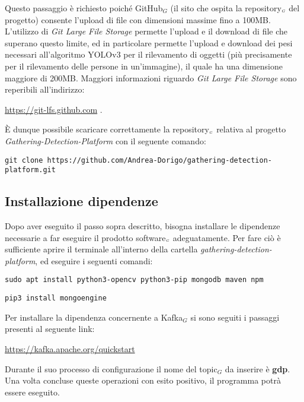 Questo passaggio è richiesto poiché GitHub$_G$ (il sito che ospita la repository$_{\scaleto{G}{3pt}}$ del progetto) consente l'upload di file con dimensioni massime fino a 100MB.
L'utilizzo di \textit{Git Large File Storage} permette l'upload e il download di file che superano questo limite, ed in particolare permette l'upload e download dei pesi necessari all'algoritmo YOLOv3 per il rilevamento di oggetti (più precisamente per il rilevamento delle persone in un'immagine), il quale ha una dimensione maggiore di 200MB. Maggiori informazioni riguardo \textit{Git Large File Storage} sono reperibili all'indirizzo:
\begin{center}
 \url{https://git-lfs.github.com} .
\end{center}

È dunque possibile scaricare correttamente la repository$_{\scaleto{G}{3pt}}$ relativa al progetto \textit{Gathering-Detection-Platform} con il seguente comando:
\begin{lstlisting}
git clone https://github.com/Andrea-Dorigo/gathering-detection-platform.git
\end{lstlisting}

\subsection{Installazione dipendenze}\label{RequisitiDiSistemaEdInstallazioneInstallazioneInstallazioneDipendenze}
Dopo aver eseguito il passo sopra descritto, bisogna installare le dipendenze necessarie a far eseguire il prodotto software$_{\scaleto{G}{3pt}}$ adeguatamente.
Per fare ciò è sufficiente aprire il terminale all'interno della cartella \textit{gathering-detection-platform}, ed eseguire i seguenti comandi:
\begin{lstlisting}
sudo apt install python3-opencv python3-pip mongodb maven npm
\end{lstlisting}
\begin{lstlisting}
pip3 install mongoengine
\end{lstlisting}
Per installare la dipendenza concernente a Kafka$_G$ si sono seguiti i passaggi presenti al seguente link:
\begin{center}
	\url{https://kafka.apache.org/quickstart}
\end{center}
Durante il suo processo di configurazione il nome del topic$_G$ da inserire è \textbf{gdp}.
Una volta concluse queste operazioni con esito positivo, il programma potrà essere eseguito.

